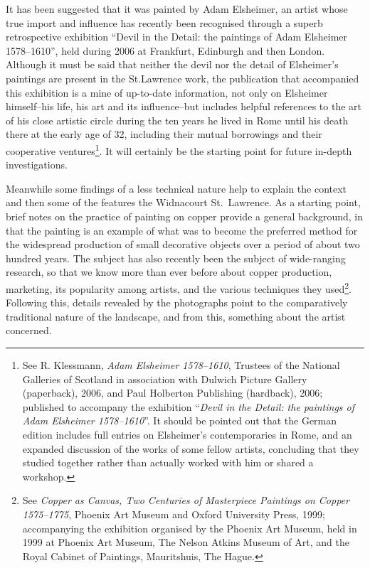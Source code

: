 \documentclass[a4paper,12pt]{article}
\begin{document}
It has been suggested that it was painted by Adam Elsheimer, an artist
whose true import and influence has recently been recognised through a
superb retrospective exhibition ``Devil in the Detail: the paintings
of Adam Elsheimer 1578--1610'', held during 2006 at Frankfurt,
Edinburgh and then London.  Although it must be said that neither the
devil nor the detail of Elsheimer's paintings are present in the
St.Lawrence work, the publication that accompanied this exhibition is
a mine of up-to-date information, not only on Elsheimer himself--his
life, his art and its influence--but includes helpful references to
the art of his close artistic circle during the ten years he lived in
Rome until his death there at the early age of 32, including their
mutual borrowings and their cooperative ventures\footnote{See
  R. Klessmann, \textit{Adam Elsheimer 1578--1610}, Trustees of the
  National Galleries of Scotland in association with Dulwich Picture
  Gallery (paperback), 2006, and Paul Holberton Publishing (hardback),
  2006; published to accompany the exhibition ``\textit{Devil in the
    Detail: the paintings of Adam Elsheimer 1578--1610}''. It should be
  pointed out that the German edition includes full entries on
  Elsheimer’s contemporaries in Rome, and an expanded discussion of
  the works of some fellow artists, concluding that they studied
  together rather than actually worked with him or shared a workshop.
}. It will certainly be the starting point for future in-depth
investigations.

Meanwhile some findings of a less technical nature help to explain the
context and then some of the features the Widnacourt St.~Lawrence.  As
a starting point, brief notes on the practice of painting on copper
provide a general background, in that the painting is an example of
what was to become the preferred method for the widespread production
of small decorative objects over a period of about two hundred years.
The subject has also recently been the subject of wide-ranging
research, so that we know more than ever before about copper
production, marketing, its popularity among artists, and the various
techniques they used\footnote{See \textit{Copper as Canvas, Two
    Centuries of Masterpiece Paintings on Copper 1575--1775}, Phoenix
  Art Museum and Oxford University Press, 1999; accompanying the
  exhibition organised by the Phoenix Art Museum, held in 1999 at
  Phoenix Art Museum, The Nelson Atkins Museum of Art, and the Royal
  Cabinet of Paintings, Mauritshuis, The Hague.  }. Following this,
details revealed by the photographs point to the comparatively
traditional nature of the landscape, and from this, something about
the artist concerned.
\end{document}
